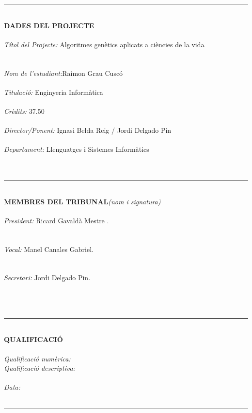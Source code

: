 \documentclass[titlepage,a4paper,12pt]{book}
\begin{document}
\thispagestyle{empty}
\rule{160mm}{0.20mm}\\
\textbf{DADES DEL PROJECTE}\\
\\
\textit{Títol del Projecte:} Algoritmes genètics aplicats a ciències de la vida\\
\\
\\
\textit{Nom de l'estudiant:}Raimon Grau Cuscó\\
\\
\textit{Titulació:} Enginyeria Informàtica\\
\\
\textit{Crèdits:} 37.50 \\
\\
\textit{Director/Ponent:} Ignasi Belda Reig / Jordi Delgado Pin\\
\\
\textit{Departament:} Llenguatges i Sistemes Informàtics\\
\\
\\
\rule{160mm}{0.20mm}\\
\textbf{MEMBRES DEL TRIBUNAL}\textit{(nom i signatura)}\\
\\
\textit{President:} Ricard Gavaldà Mestre .\\
\\
\\
\textit{Vocal:} Manel Canales Gabriel.\\
\\
\\
\textit{Secretari:} Jordi Delgado Pin.\\
\\
\\
\\
\rule{160mm}{0.20mm}\\
\textbf{QUALIFICACIÓ}\\
\\
\textit{Qualificació numèrica:}\\
\textit{Qualificació descriptiva:}\\
\\
\textit{Data:}
\\
\\
\rule{160mm}{0.20mm}\\
\newpage{\pagestyle{empty}\cleardoublepage}
\end{document}
